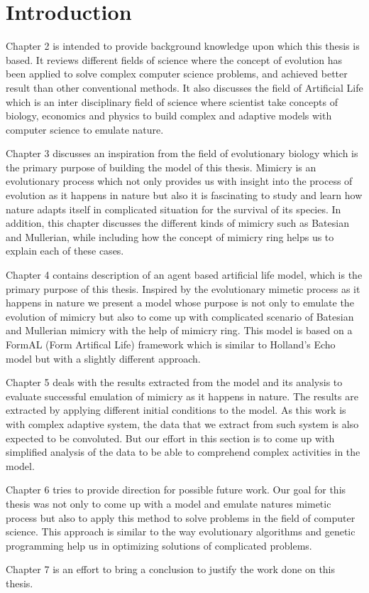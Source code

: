 \chapter{Introduction}


Chapter 2 is intended to provide background knowledge upon which this thesis is based. It reviews different fields of science where the concept of evolution has been applied to solve complex computer science problems, and achieved better result than other conventional methods. It also discusses the field of Artificial Life which is an inter disciplinary field of science where scientist take concepts of biology, economics and physics to build complex and adaptive models with computer science to emulate nature. 

Chapter 3 discusses an inspiration from the field of evolutionary biology which is the primary purpose of building the model of this thesis. Mimicry is an evolutionary process which not only provides us with insight into the process of evolution as it happens in nature but also it is fascinating to study and learn how nature adapts itself in complicated situation for the survival of its species. In addition, this chapter discusses the different kinds of mimicry such as Batesian and Mullerian, while including how the concept of mimicry ring helps us to explain each of these cases. 

Chapter 4 contains description of an agent based artificial life model, which is the primary purpose of this thesis. Inspired by the evolutionary mimetic process as it happens in nature we present a model whose purpose is not only to emulate the evolution of mimicry but also to come up with complicated scenario of Batesian and Mullerian mimicry with the help of mimicry ring. This model is based on a FormAL (Form Artifical Life) framework which is similar to Holland's Echo model but with a slightly different approach. 

Chapter 5 deals with the results extracted from the model and its analysis to evaluate successful emulation of mimicry as it happens in nature. The results are extracted by applying different initial conditions to the model. As this work is with complex adaptive system, the data that we extract from such system is also expected to be convoluted. But our effort in this section is to come up with simplified analysis of the data to be able to comprehend complex activities in the model. 

Chapter 6 tries to provide direction for possible future work. Our goal for this thesis was not only to come up with a model and emulate natures mimetic process but also to apply this method to solve problems in the field of computer science. This approach is similar to the way evolutionary algorithms and genetic programming help us in optimizing solutions of complicated problems. 

Chapter 7 is an effort to bring a conclusion to justify the work done on this thesis. 